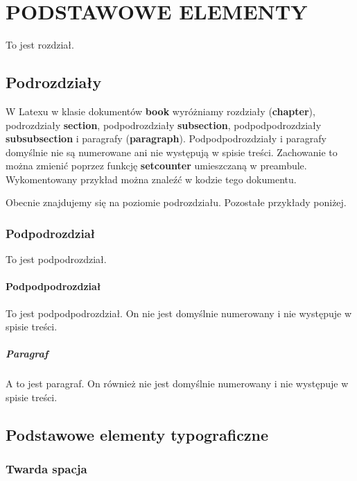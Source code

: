 \chapter{PODSTAWOWE ELEMENTY}

To jest rozdział.

\section{Podrozdziały}

W Latexu w klasie dokumentów \textbf{book} wyróżniamy rozdziały (\textbf{chapter}), podrozdziały \textbf{section}, podpodrozdziały \textbf{subsection}, podpodpodrozdziały \textbf{subsubsection} i paragrafy (\textbf{paragraph}). Podpodpodrozdziały i paragrafy domyślnie nie są numerowane ani nie występują w spisie treści. Zachowanie to można zmienić poprzez funkcję \textbf{setcounter} umieszczaną w preambule. Wykomentowany przykład można znaleźć w kodzie tego dokumentu.

Obecnie znajdujemy się na poziomie podrozdziału. Pozostałe przykłady poniżej.

\subsection{Podpodrozdział}

To jest podpodrozdział.

\subsubsection{Podpodpodrozdział}

To jest podpodpodrozdział. On nie jest domyślnie numerowany i nie występuje w spisie treści.

\paragraph{Paragraf}

A to jest paragraf. On również nie jest domyślnie numerowany i nie występuje w spisie treści.

\section{Podstawowe elementy typograficzne}

\subsection{Twarda spacja}

